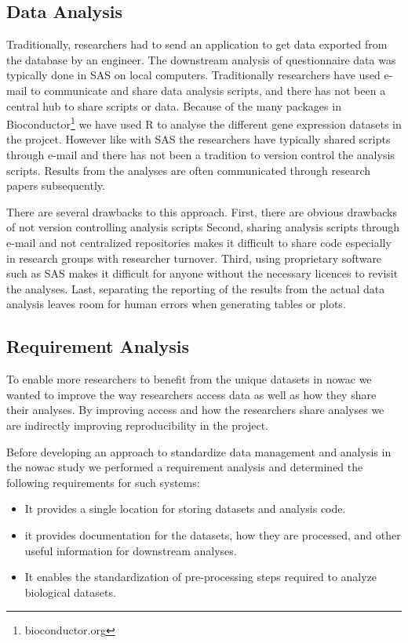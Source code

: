\subsection{Data Analysis} 
Traditionally, researchers had to send an application to get data exported from
the database by an engineer. The downstream analysis of questionnaire data was
typically done in SAS on local computers.  Traditionally researchers have used
e-mail to communicate and share data analysis scripts, and there has not been a
central hub to share scripts or data. Because of the many packages in
Bioconductor\footnote{bioconductor.org} we have used R to analyse the different
gene expression datasets in the projcet. However like with SAS the researchers
have typically shared scripts through e-mail and there has not been a tradition
to version control the analysis scripts. Results from the analyses are often
communicated through research papers subsequently. 

There are several drawbacks to this approach. First, there are obvious drawbacks
of not version controlling analysis scripts 
Second, sharing analysis scripts through e-mail and not centralized repositories
makes it difficult to share code especially in research groups with researcher
turnover. 
Third, using proprietary software
such as SAS makes it difficult for anyone without the necessary licences to
revisit the analyses. Last, separating the reporting of the results from the
actual data analysis leaves room for human errors when generating tables or
plots. 



\subsection{Requirement Analysis} 
To enable more researchers to benefit from the unique datasets in \gls{nowac} we
wanted to improve the way researchers access data as well as how they share
their analyses. By improving access and how the researchers share analyses we
are indirectly improving reproducibility in the project. 

Before developing an approach to standardize data management and analysis in the
\gls{nowac} study we performed a requirement analysis and determined the
following requirements for such systems: 

\begin{itemize} 
    \item It provides a single location for storing datasets and analysis code.
    \item it provides documentation for the datasets, how they are processed,
    and other useful information for downstream analyses. 
    \item It enables the standardization of pre-processing steps required to
    analyze biological datasets. 
\end{itemize}

